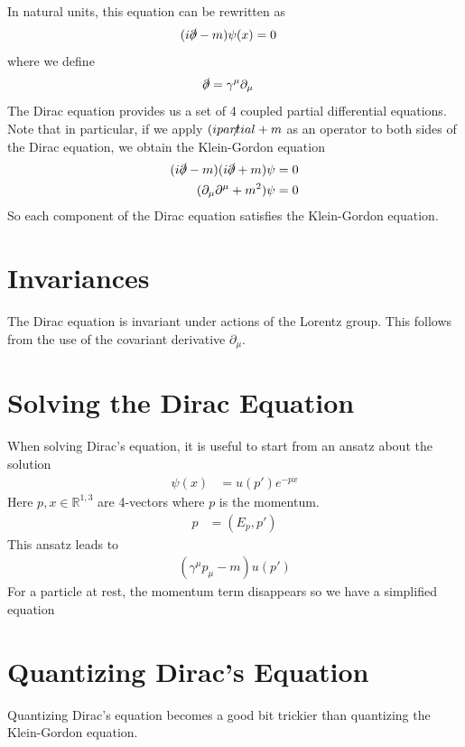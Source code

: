 \documentclass[book.tex]{subfiles}
\begin{document}

In natural units, this equation can be rewritten as
\begin{align}
    (i\slashed{\partial} - m)\psi(x) &= 0
\end{align}
where we define
\begin{align}
    \slashed{\partial} &= \gamma^\mu \partial_\mu
\end{align}
The Dirac equation provides us a set of 4 coupled partial differential equations. Note that in particular, if we apply $(i\slashed{partial} + m$ as an operator to both sides of the Dirac equation, we obtain the Klein-Gordon equation
\begin{align}
    (i\slashed{\partial} - m)(i\slashed{\partial} + m)\psi &= 0 \\
    (\partial_\mu \partial^\mu + m^2) \psi &= 0
\end{align}
So each component of the Dirac equation satisfies the Klein-Gordon equation. 

\section{Invariances}

The Dirac equation is invariant under actions of the Lorentz group. This follows from the use of the covariant derivative $\partial_{\mu}$. %

\section{Solving the Dirac Equation}

When solving Dirac's equation, it is useful to start from an ansatz about the solution
\begin{align}
    \psi(x) &= u(p') e^{-p \dot x}
\end{align}
Here $p, x \in \mathbb{R}^{1,3}$ are 4-vectors where $p$ is the momentum.
\begin{align}
p &= (E_p, p')    
\end{align}
This ansatz leads to
\begin{align}
    (\gamma^{\mu} p_{\mu} - m)u(p')
\end{align}
For a particle at rest, the momentum term disappears so we have a simplified equation
\section{Quantizing Dirac's Equation}

Quantizing Dirac's equation becomes a good bit trickier than quantizing the Klein-Gordon equation.
\end{document}
